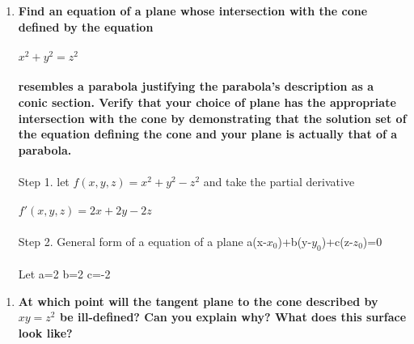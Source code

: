 \documentclass{article}
\begin{document}
\begin{enumerate}[10.]
	\item\textbf{Find an equation of a plane whose intersection with the cone defined by the
	      equation\\\\$x^{2} + y^{2} = z^{2}$\\\\resembles a parabola justifying the parabola’s description as a conic section. Verify that your choice of plane has the appropriate intersection with the cone by demonstrating that the solution set of the equation defining the cone and your plane is actually that of a parabola.}\\
	\\
	Step 1. let $f(x,y,z)=x^{2} + y^{2}- z^{2}$ and take the partial derivative\\
	\\
	$f'(x,y,z)=2x+2y-2z$\\
	\\
	Step 2. General form of a equation of a plane a(x-$x_{0}$)+b(y-$y_{0}$)+c(z-$z_{0}$)=0\\
	\\
	Let a=2 b=2 c=-2
\end{enumerate}
\begin{enumerate}[11.]
	\item\textbf{At which point will the tangent plane to the cone described by $xy = z^2$
	be ill-defined? Can you explain why? What does this surface look like?}
\end{enumerate}
\end{document}
